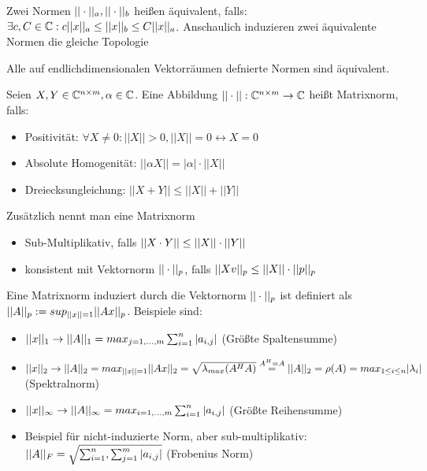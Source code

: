 \begin{definition}
	Zwei Normen $||\cdot||_a, ||\cdot||_b $ heißen äquivalent, falls: $\exists c, C \in \mathbb{C} : c ||x||_a \leq ||x||_b \leq C ||x||_a$. Anschaulich induzieren zwei äquivalente Normen die gleiche Topologie
\end{definition}

\begin{satz}
	Alle auf endlichdimensionalen Vektorräumen defnierte Normen sind äquivalent.
\end{satz}

\begin{definition}[Matrixnorm]
	Seien $X, Y \in \mathbb{C}^{n \times m}, \alpha \in \mathbb{C}$. Eine Abbildung $||\cdot|| : \mathbb{C}^{n \times m} \rightarrow \mathbb{C}$ heißt Matrixnorm, falls:
	
	\begin{itemize}[noitemsep]
		\item Positivität: $\forall X \neq 0 : ||X|| > 0, ||X|| = 0 \leftrightarrow X = 0 $
		\item Absolute Homogenität: $||\alpha X|| = |\alpha| \cdot ||X||$
		\item Dreiecksungleichung: $||X + Y|| \leq ||X|| + ||Y||$
	\end{itemize}
	Zusätzlich nennt man eine Matrixnorm
	\begin{itemize}[noitemsep]
		\item Sub-Multiplikativ, falls $||X \cdot Y|| \leq ||X|| \cdot ||Y||$
		\item konsistent mit Vektornorm $||\cdot||_p$, falls $||X v||_p \leq ||X|| \cdot ||p||_p$		
	\end{itemize}
\end{definition}

\begin{definition}
	Eine Matrixnorm induziert durch die Vektornorm $||\cdot||_p$ ist definiert als $||A||_p := sup_{||x|| = 1}||Ax||_p$. Beispiele sind:
	\begin{itemize}[noitemsep]
		\item $||x||_1 \rightarrow ||A||_1 = max_{j=1,...,m} \sum_{i = 1}^n |a_{i,j}|$ (Größte Spaltensumme)
		\item $||x||_2 \rightarrow ||A||_2 = max_{||x||=1} ||Ax||_2 = \sqrt{\lambda_{max}(A^HA)} \overset{A^H = A}{=} ||A||_2 = \rho(A) = max_{1 \leq i \leq n}|\lambda_i|$ (Spektralnorm)	
		\item $||x||_\infty \rightarrow ||A||_\infty = max_{i=1,...,m} \sum_{i = 1}^n |a_{i,j}|$ (Größte Reihensumme)
		\item Beispiel für nicht-induzierte Norm, aber sub-multiplikativ: \\ $||A||_F = \sqrt{\sum_{i = 1}^n, \sum_{j = 1}^m |a_{i,j}|}$ (Frobenius Norm)
	\end{itemize}
\end{definition}

